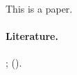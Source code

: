 This is a paper.

\paragraph{Literature.}
\citet*{Akerlof-1970-QJE}; \citet*{Spence-1973-QJE} (\citealt{Diamond-1971-JET}).
